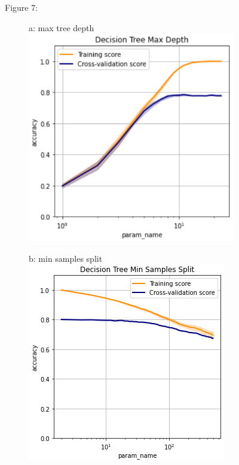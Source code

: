 \documentclass{article}
\begin{document}
\begin{figure}
	\centering
	Figure 7:\\
	\begin{subfigure}{.24\textwidth}
		\centering
		a: max tree depth\\
		\includegraphics[width=\linewidth]{mnist_decision_max_depth.png}
		
	\end{subfigure}
	\begin{subfigure}{.24\textwidth}
		\centering
		b: min samples split\\
		\includegraphics[width=\linewidth]{mnist_decision_min_samples_split.png}
		

\end{subfigure}
\end{figure}
\end{document}
